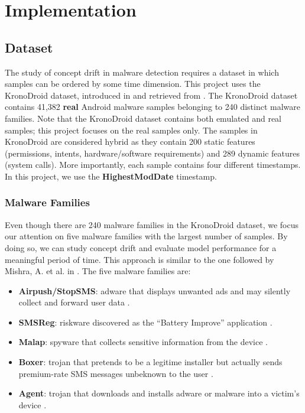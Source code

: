 \chapter{Implementation}
\section{Dataset\label{sec:dataset}}
The study of concept drift in malware detection requires a dataset in which samples
can be ordered by some time dimension. This project uses the KronoDroid dataset, introduced in
\cite{guerra2021kronodroid} and retrieved from \cite{guerra2021github}.
The KronoDroid dataset contains 41,382 \textbf{real}
Android malware samples belonging to 240 distinct malware families.
Note that the KronoDroid dataset contains both emulated and real samples; this project
focuses on the real samples only. The samples in KronoDroid are considered
hybrid as they contain 200 static features
(permissions, intents, hardware/software requirements) and
289 dynamic features (system calls).
More importantly, each sample contains four different timestamps.
In this project, we use the \textbf{HighestModDate} timestamp.

\subsection{Malware Families}
Even though there are 240 malware families in the KronoDroid dataset, we focus our attention
on five malware families with the largest number of samples. By doing so, we can
study concept drift and evaluate model performance for a meaningful period of time.
This approach is similar to the one followed by Mishra, A. et al. in \cite{mishra2024cluster}.
The five malware families are:
\begin{itemize}
    \item \textbf{Airpush/StopSMS}: adware that displays unwanted ads and may silently collect
          and forward user data \cite{fsecure2025airpush}.
    \item \textbf{SMSReg}: riskware discovered as the ``Battery Improve'' application \cite{fsecure2025smsreg}.
    \item \textbf{Malap}: spyware that collects sensitive information from the device \cite{guerra2021kronodroid}.
    \item \textbf{Boxer}: trojan that pretends to be a legitime installer but actually sends premium-rate
          SMS messages unbeknown to the user \cite{fsecure2025boxer}.
    \item \textbf{Agent}: trojan that downloads and installs adware or malware into a victim's
          device \cite{fsecure2025agent}.
\end{itemize}

